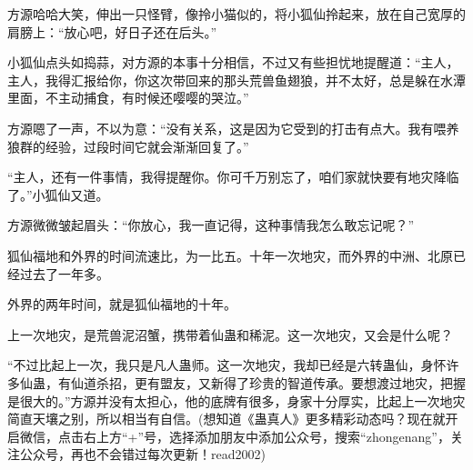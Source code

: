 \begin{this_body}
方源哈哈大笑，伸出一只怪臂，像拎小猫似的，将小狐仙拎起来，放在自己宽厚的肩膀上：“放心吧，好日子还在后头。”

小狐仙点头如捣蒜，对方源的本事十分相信，不过又有些担忧地提醒道：“主人，主人，我得汇报给你，你这次带回来的那头荒兽鱼翅狼，并不太好，总是躲在水潭里面，不主动捕食，有时候还嘤嘤的哭泣。”

方源嗯了一声，不以为意：“没有关系，这是因为它受到的打击有点大。我有喂养狼群的经验，过段时间它就会渐渐回复了。”

“主人，还有一件事情，我得提醒你。你可千万别忘了，咱们家就快要有地灾降临了。”小狐仙又道。

方源微微皱起眉头：“你放心，我一直记得，这种事情我怎么敢忘记呢？”

狐仙福地和外界的时间流速比，为一比五。十年一次地灾，而外界的中洲、北原已经过去了一年多。

外界的两年时间，就是狐仙福地的十年。

上一次地灾，是荒兽泥沼蟹，携带着仙蛊和稀泥。这一次地灾，又会是什么呢？

“不过比起上一次，我只是凡人蛊师。这一次地灾，我却已经是六转蛊仙，身怀许多仙蛊，有仙道杀招，更有盟友，又新得了珍贵的智道传承。要想渡过地灾，把握是很大的。”方源并没有太担心，他的底牌有很多，身家十分厚实，比起上一次地灾简直天壤之别，所以相当有自信。(想知道《蛊真人》更多精彩动态吗？现在就开启微信，点击右上方“+”号，选择添加朋友中添加公众号，搜索“zhongenang”，关注公众号，再也不会错过每次更新！read2002)

\end{this_body}

